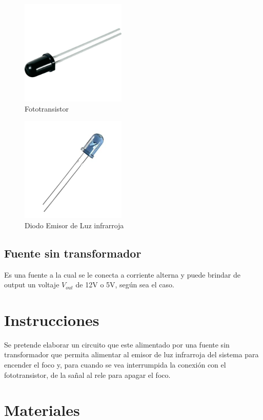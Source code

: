 \documentclass[]{article}
\begin{document}
\begin{figure}[htb]
    \centering
    \includegraphics[width=5cm]{build/Imagenes/Fototransistor.jpg}
    \caption{Fototransistor}
\end{figure}

\begin{figure}[htb]
    \centering
    \includegraphics[width=5cm]{build/Imagenes/emisor.jpg}
    \caption{Diodo Emisor de Luz infrarroja}
\end{figure}

\subsection{Fuente sin transformador}

Es una fuente a la cual se le conecta a corriente alterna y puede brindar de output un voltaje $V_{out}$ de 12V o 5V, según sea el caso.

\section{Instrucciones}

Se pretende elaborar un circuito que este alimentado por una fuente sin transformador que permita alimentar al emisor de luz infrarroja del sistema para encender el foco y, 
para cuando se vea interrumpida la conexión con el fototransistor, de la sañal al rele para apagar el foco.

\section{Materiales}
\end{document}

